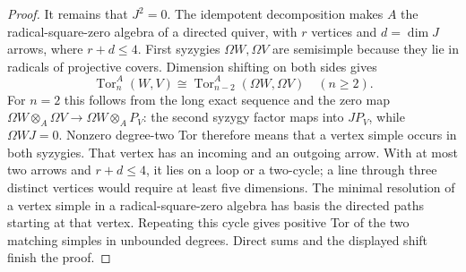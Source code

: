 \begin{proof}
It remains that $J^2=0$. The idempotent decomposition makes
$A$ the radical-square-zero algebra of a directed quiver,
with $r$ vertices and $d=\dim J$ arrows, where $r+d\leq4$.
First syzygies $\Omega W,\Omega V$ are semisimple because
they lie in radicals of projective covers. Dimension shifting
on both sides gives
\[
 \operatorname{Tor}_n^A(W,V)
   \cong\operatorname{Tor}_{n-2}^A(\Omega W,\Omega V)
 \quad(n\geq2).
\]
For $n=2$ this follows from the long exact sequence and the
zero map $\Omega W\otimes_A\Omega V\to
\Omega W\otimes_A P_V$: the second syzygy factor maps into
$JP_V$, while $\Omega WJ=0$.
Nonzero degree-two Tor therefore means that a vertex simple
occurs in both syzygies. That vertex has an incoming and an
outgoing arrow. With at most two arrows and $r+d\leq4$,
it lies on a loop or a two-cycle; a line through three
distinct vertices would require at least five dimensions.
The minimal resolution of a vertex simple in a
radical-square-zero algebra has basis the directed paths
starting at that vertex. Repeating this cycle gives positive
Tor of the two matching simples in unbounded degrees.
Direct sums and the displayed shift finish the proof.
\end{proof}

